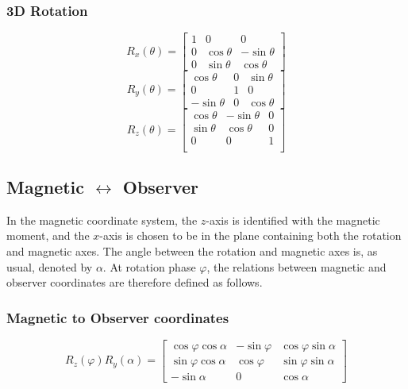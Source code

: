 \documentclass[twocolumn]{article}
\newcommand{\phase}{\varphi}
\begin{document}
\subsubsection*{3D Rotation}
\begin{equation}
    R_x(\theta) = \begin{bmatrix}
        1 & 0 & 0 \\
        0 & \cos\theta & -\sin\theta \\
        0 & \sin\theta & \cos\theta
    \end{bmatrix}
\end{equation}
\begin{equation}
    R_y(\theta) = \begin{bmatrix}
        \cos\theta & 0 & \sin\theta \\
        0 & 1 & 0 \\
        -\sin\theta & 0 & \cos\theta
    \end{bmatrix}
\end{equation}
\begin{equation}
    R_z(\theta) = \begin{bmatrix}
        \cos\theta & -\sin\theta & 0 \\
        \sin\theta & \cos\theta & 0 \\
        0 & 0 & 1 \\
    \end{bmatrix}
\end{equation}

\subsection{Magnetic $\leftrightarrow$ Observer}

In the magnetic coordinate system, the $z$-axis is identified with the magnetic moment, and the $x$-axis is chosen to be in the plane containing both the rotation and magnetic axes.
The angle between the rotation and magnetic axes is, as usual, denoted by $\alpha$.
At rotation phase $\phase$, the relations between magnetic and observer coordinates are therefore defined as follows.

\subsubsection*{Magnetic to Observer coordinates}
\begin{equation}
    R_z(\phase) R_y(\alpha) =
    \begin{bmatrix}
        \cos\phase\cos\alpha & -\sin\phase & \cos\phase\sin\alpha \\
        \sin\phase\cos\alpha &  \cos\phase & \sin\phase\sin\alpha \\
        -\sin\alpha          & 0           & \cos\alpha
    \end{bmatrix}
\end{equation}
\end{document}
